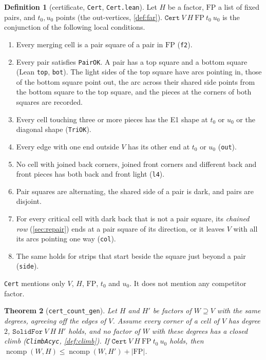 \documentclass[11pt]{article}
\theoremstyle{plain}
\newtheorem{theorem}{Theorem}[section]
\theoremstyle{definition}
\newtheorem{definition}[theorem]{Definition}
\theoremstyle{remark}
\newcommand{\lean}[1]{\texttt{#1}}
\newcommand{\ncomp}{\operatorname{ncomp}}
\begin{document}
\begin{definition}[certificate, \lean{Cert}, \lean{Cert.lean}]
\label{def:cert}
Let $H$ be a factor, $\mathrm{FP}$ a list of fixed pairs, and $t_0,u_0$ points (the out-vertices,
\cref{def:far}).
$\lean{Cert}\ V\ H\ \mathrm{FP}\ t_0\ u_0$ is the conjunction of the following local conditions.
\begin{enumerate}[label=(\arabic*)]
\item Every merging cell is a pair square of a pair in $\mathrm{FP}$ (\lean{f2}).
\item Every pair satisfies \lean{PairOK}.
  A pair has a top square and a bottom square (Lean \lean{top}, \lean{bot}).
  The light sides of the top square have arcs pointing in, those of the bottom square point out,
  the arc across their shared side points from the bottom square to the top square, and the pieces
  at the corners of both squares are recorded.
\item Every cell touching three or more pieces has the E1 shape at $t_0$ or $u_0$ or the diagonal
  shape (\lean{TriOK}).
\item Every edge with one end outside $V$ has its other end at $t_0$ or $u_0$ (\lean{out}).
\item No cell with joined back corners, joined front corners and different back and front pieces
  has both back and front light (\lean{l4}).
\item Pair squares are alternating, the shared side of a pair is dark, and pairs are disjoint.
\item For every critical cell with dark back that is not a pair square, its \emph{chained row}
  (\cref{sec:repair}) ends at a pair square of its direction, or it leaves $V$ with all its arcs
  pointing one way (\lean{col}).
\item The same holds for strips that start beside the square just beyond a pair (\lean{side}).
\end{enumerate}
\end{definition}

\lean{Cert} mentions only $V$, $H$, $\mathrm{FP}$, $t_0$ and $u_0$.
It does not mention any competitor factor.

\begin{theorem}[\lean{cert\_count\_gen}]
\label{thm:cert}
Let $H$ and $H'$ be factors of $W\supseteq V$ with the same degrees, agreeing off the edges of $V$.
Assume every corner of a cell of $V$ has degree $2$, $\lean{SolidFor}\ V\ H\ H'$ holds, and no
factor of $W$ with these degrees has a closed climb (\lean{ClimbAcyc}, \cref{def:climb}).
If $\lean{Cert}\ V\ H\ \mathrm{FP}\ t_0\ u_0$ holds, then
$\ncomp(W,H)\le\ncomp(W,H')+|\mathrm{FP}|$.
\end{theorem}
\end{document}
